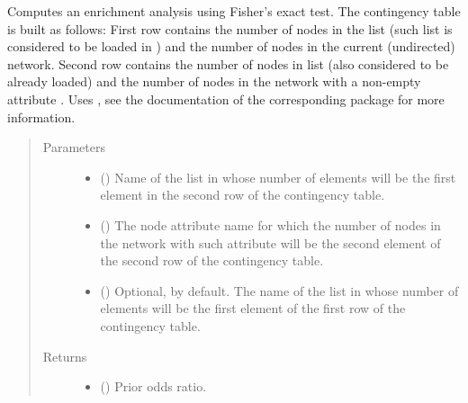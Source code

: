 \documentclass[letterpaper,10pt,english]{sphinxmanual}
\begin{document}
\begin{fulllineitems}
\begin{fulllineitems}
\label{\detokenize{main:pypath.main.PyPath.fisher_enrichment}}
Computes an enrichment analysis using Fisher’s exact test. The
contingency table is built as follows:
First row contains the number of nodes in the  list (such
list is considered to be loaded in
) and the number of nodes in
the current (undirected) network. Second row contains the number
of nodes in  list (also considered to be already loaded)
and the number of nodes in the network with a non-empty
attribute . Uses , see
the documentation of the corresponding package for more
information.
\begin{quote}\begin{description}
\item[{Parameters}] \leavevmode\begin{itemize}
\item {} 
 () \textendash{} Name of the list in 
whose number of elements will be the first element in the
second row of the contingency table.

\item {} 
 () \textendash{} The node attribute name for which the number of nodes in the
network with such attribute will be the second element of
the second row of the contingency table.

\item {} 
 () \textendash{} Optional,  by default. The name of the list in
 whose number of elements
will be the first element of the first row of the
contingency table.

\end{itemize}

\item[{Returns}] \leavevmode
\begin{itemize}
\item {} 
() \textendash{} Prior odds ratio.


\end{itemize}
\end{description}
\end{quote}
\end{fulllineitems}
\end{fulllineitems}
\end{document}
